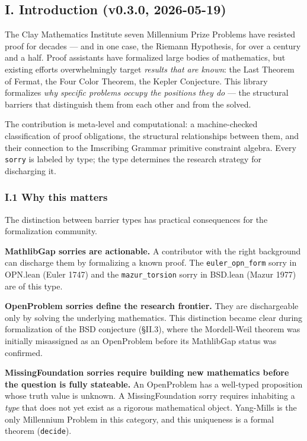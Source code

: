 \documentclass[12pt,a4paper]{article}
\newcommand{\pilcrow}{\S}
\begin{document}
\subsection{I. Introduction (v0.3.0, 2026-05-19)}

The Clay Mathematics Institute seven Millennium Prize Problems have resisted proof for decades --- and in one case, the Riemann Hypothesis, for over a century and a half. Proof assistants have formalized large bodies of mathematics, but existing efforts overwhelmingly target \emph{results that are known}: the Last Theorem of Fermat, the Four Color Theorem, the Kepler Conjecture. This library formalizes \emph{why specific problems occupy the positions they do} --- the structural barriers that distinguish them from each other and from the solved.

The contribution is meta-level and computational: a machine-checked classification of proof obligations, the structural relationships between them, and their connection to the Imscribing Grammar primitive constraint algebra. Every \texttt{sorry} is labeled by type; the type determines the research strategy for discharging it.

\subsubsection{I.1 Why this matters}

The distinction between barrier types has practical consequences for the formalization community.

\textbf{MathlibGap sorries are actionable.} A contributor with the right background can discharge them by formalizing a known proof. The \texttt{euler\_opn\_form} sorry in OPN.lean (Euler 1747) and the \texttt{mazur\_torsion} sorry in BSD.lean (Mazur 1977) are of this type.

\textbf{OpenProblem sorries define the research frontier.} They are dischargeable only by solving the underlying mathematics. This distinction became clear during formalization of the BSD conjecture (\pilcrow{}II.3), where the Mordell-Weil theorem was initially misassigned as an OpenProblem before its MathlibGap status was confirmed.

\textbf{MissingFoundation sorries require building new mathematics before the question is fully stateable.} An OpenProblem has a well-typed proposition whose truth value is unknown. A MissingFoundation sorry requires inhabiting a \emph{type} that does not yet exist as a rigorous mathematical object. Yang-Mills is the only Millennium Problem in this category, and this uniqueness is a formal theorem (\texttt{decide}).
\end{document}
